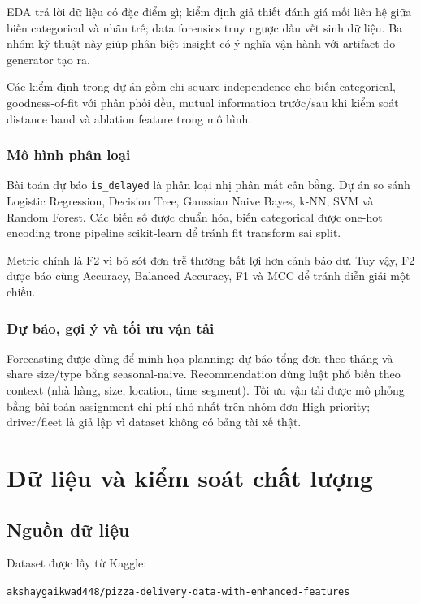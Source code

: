 \documentclass[12pt,a4paper,oneside]{report}
\newcommand{\code}[1]{\nolinkurl{#1}}
\begin{document}
EDA trả lời dữ liệu có đặc điểm gì; kiểm định giả thiết đánh giá mối liên hệ
giữa biến categorical và nhãn trễ; data forensics truy ngược dấu vết sinh dữ
liệu. Ba nhóm kỹ thuật này giúp phân biệt insight có ý nghĩa vận hành với
artifact do generator tạo ra.

Các kiểm định trong dự án gồm chi-square independence cho biến categorical,
goodness-of-fit với phân phối đều, mutual information trước/sau khi kiểm soát
distance band và ablation feature trong mô hình.

\subsection{Mô hình phân loại}

Bài toán dự báo \code{is\_delayed} là phân loại nhị phân mất cân bằng. Dự án so
sánh Logistic Regression, Decision Tree, Gaussian Naive Bayes, k-NN, SVM và
Random Forest. Các biến số được chuẩn hóa, biến categorical được one-hot
encoding trong pipeline scikit-learn để tránh fit transform sai split.

Metric chính là F2 vì bỏ sót đơn trễ thường bất lợi hơn cảnh báo dư. Tuy vậy,
F2 được báo cùng Accuracy, Balanced Accuracy, F1 và MCC để tránh diễn giải một
chiều.

\subsection{Dự báo, gợi ý và tối ưu vận tải}

Forecasting được dùng để minh họa planning: dự báo tổng đơn theo tháng và share
size/type bằng seasonal-naive. Recommendation dùng luật phổ biến theo context
(nhà hàng, size, location, time segment). Tối ưu vận tải được mô phỏng bằng bài
toán assignment chi phí nhỏ nhất trên nhóm đơn High priority; driver/fleet là
giả lập vì dataset không có bảng tài xế thật.

\chapter{Dữ liệu và kiểm soát chất lượng}

\section{Nguồn dữ liệu}

Dataset được lấy từ Kaggle:

\begin{center}
\code{akshaygaikwad448/pizza-delivery-data-with-enhanced-features}
\end{center}
\end{document}
